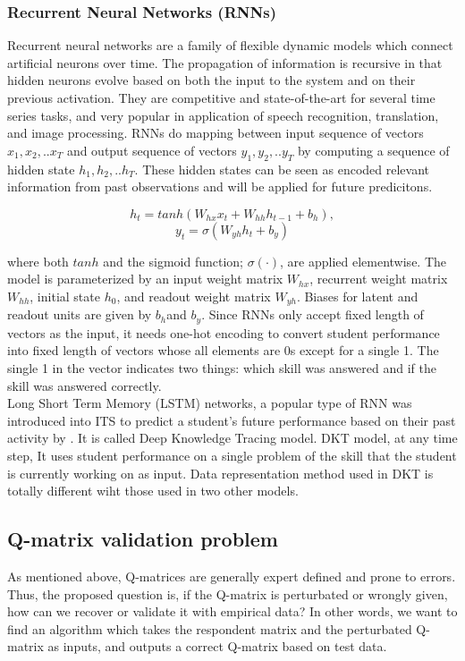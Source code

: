 \documentclass[12pt]{article}
\begin{document}
\subsubsection{Recurrent Neural Networks (RNNs)}
 Recurrent neural networks are a family of flexible dynamic models which connect artificial neurons over time. The propagation of information is recursive in that hidden neurons evolve based on both the input to the system and on their previous activation\cite{williams1989learning}. They are competitive and state-of-the-art for several time series tasks, and very popular in application of speech recognition, translation, and image processing. RNNs do mapping between input sequence of vectors $x_1,x_2,..x_T$ and output sequence of vectors $y_1,y_2,..y_T$ by computing a sequence of hidden state $h_1,h_2,..h_T$. These hidden states can be seen as encoded relevant information from past observations and will be applied for future predicitons. 
 
 $$h_t = tanh (W_{hx} x_t + W_{hh} h_{t-1} + b_h),$$
 $$ y_t= \sigma (W_{yh} h_t + b_y)$$

where both $tanh$ and the sigmoid function; $\sigma ( \cdotp) $, are applied elementwise. The model is parameterized by an input weight matrix $W_{hx}$, recurrent weight matrix $W_{hh}$, initial state $h_0$, and readout weight matrix $W_{yh}$. Biases for latent and readout units are given by $b_h $and $b_y$. Since RNNs only accept fixed
length of vectors as the input, it needs one-hot encoding to convert student performance into fixed length of vectors whose all elements are 0s except for a single 1. The single 1 in the vector indicates two things: which skill was answered and if the skill was
answered correctly.\\
 Long Short Term Memory (LSTM) networks, a popular type of RNN was introduced into ITS to predict a student's future performance based on
their past activity by \cite{piech2015deep}. It is called Deep Knowledge Tracing model. DKT model, at any time step, It uses student performance on a single problem of the skill that the student is currently working on as input. Data representation method used in DKT is totally different wiht those used in two other models.   
  
  
 
\subsection{Q-matrix validation problem}
As mentioned above, Q-matrices are generally expert defined and prone to errors. Thus, the proposed question is, if the Q-matrix is perturbated or wrongly given, how can we recover or validate it with empirical data? In other words, we want to find an algorithm which takes the respondent matrix and the perturbated Q-matrix as inputs, and outputs a correct Q-matrix based on test data.
\end{document}
